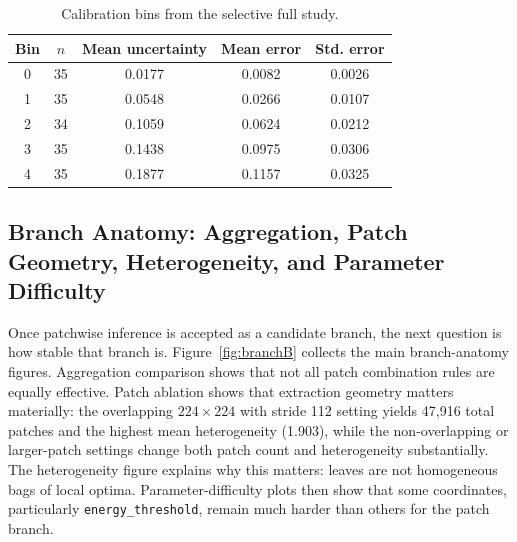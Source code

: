 \documentclass[11pt,a4paper]{article}
\begin{document}
\begin{table}[H]
\centering
\caption{Calibration bins from the selective full study.}
\label{tab:calibB}
\small
\begin{tabular}{ccccc}
\toprule
Bin & $n$ & Mean uncertainty & Mean error & Std. error \\
\midrule
0 & 35 & 0.0177 & 0.0082 & 0.0026 \\
1 & 35 & 0.0548 & 0.0266 & 0.0107 \\
2 & 34 & 0.1059 & 0.0624 & 0.0212 \\
3 & 35 & 0.1438 & 0.0975 & 0.0306 \\
4 & 35 & 0.1877 & 0.1157 & 0.0325 \\
\bottomrule
\end{tabular}
\end{table}

\subsection{Branch Anatomy: Aggregation, Patch Geometry, Heterogeneity, and Parameter Difficulty}
Once patchwise inference is accepted as a candidate branch, the next question is how stable that branch is.
Figure~\ref{fig:branchB} collects the main branch-anatomy figures.
Aggregation comparison shows that not all patch combination rules are equally effective.
Patch ablation shows that extraction geometry matters materially: the overlapping $224\times224$ with stride 112 setting yields 47{,}916 total patches and the highest mean heterogeneity (1.903), while the non-overlapping or larger-patch settings change both patch count and heterogeneity substantially.
The heterogeneity figure explains why this matters: leaves are not homogeneous bags of local optima.
Parameter-difficulty plots then show that some coordinates, particularly \texttt{energy\_threshold}, remain much harder than others for the patch branch.
\end{document}
